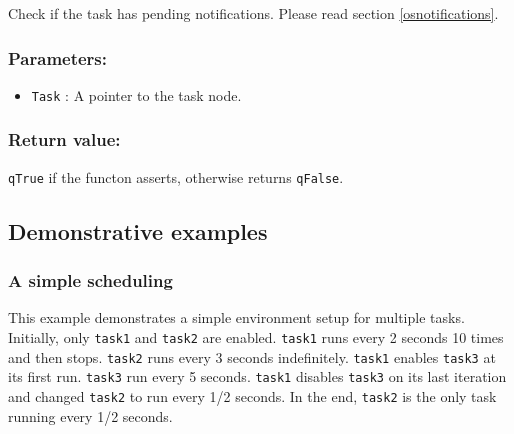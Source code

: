 \documentclass{article}
\begin{document}
Check if the task has pending notifications. Please read section \ref{osnotifications}. 

\subsubsection*{Parameters:}
\begin{itemize}
    \item \lstinline{Task} : A pointer to the task node.
\end{itemize}

\subsubsection*{Return value:}
\lstinline{qTrue} if the functon asserts, otherwise returns \lstinline{qFalse}.

\subsection{Demonstrative examples}
\subsubsection{A simple scheduling}
This example demonstrates a simple environment setup for multiple tasks. Initially, only \lstinline{task1} and \lstinline{task2} are enabled. \lstinline{task1} runs every 2 seconds 10 times and then stops. \lstinline{task2} runs every 3 seconds indefinitely. \lstinline{task1} enables \lstinline{task3} at its first run. \lstinline{task3} run every 5 seconds. \lstinline{task1} disables \lstinline{task3} on its last iteration and changed \lstinline{task2} to run every 1/2 seconds. In the end, \lstinline{task2} is the only task running every 1/2 seconds. \\
\end{document}
